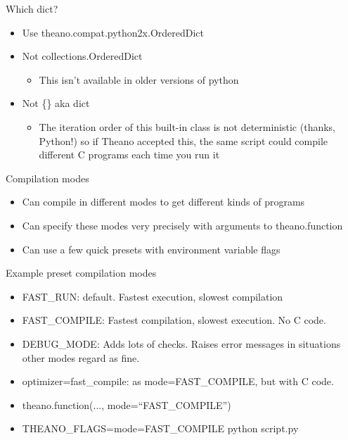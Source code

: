 \documentclass[utf8x,xcolor=pdftex,dvipsnames,table]{beamer}
\begin{document}
\begin{frame}{Which dict?}
  \begin{itemize}
  \item Use theano.compat.python2x.OrderedDict
  \item Not collections.OrderedDict
  \begin{itemize}
  \item This isn’t available in older versions of python
  \end{itemize}
  \item Not \{\} aka dict
  \begin{itemize}
  \item The iteration order of this built-in class is not
    deterministic (thanks, Python!) so if Theano
    accepted this, the same script could compile
    different C programs each time you run it
  \end{itemize}
  \end{itemize}
\end{frame}

\begin{frame}{Compilation modes}
  \begin{itemize}
  \item Can compile in different modes to get different kinds of programs
  \item Can specify these modes very precisely with arguments to theano.function
  \item Can use a few quick presets with environment variable flags
  \end{itemize}
\end{frame}

\begin{frame}{Example preset compilation modes}
  \begin{itemize}
  \item FAST\_RUN: default. Fastest execution, slowest compilation
  \item FAST\_COMPILE: Fastest compilation, slowest execution. No C code.
  \item DEBUG\_MODE: Adds lots of checks.
Raises error messages in situations other
modes regard as fine.
  \item optimizer=fast\_compile: as mode=FAST\_COMPILE, but with C code.
  \item theano.function(..., mode=``FAST\_COMPILE'')
  \item THEANO\_FLAGS=mode=FAST\_COMPILE python script.py
  \end{itemize}
\end{frame}
\end{document}
